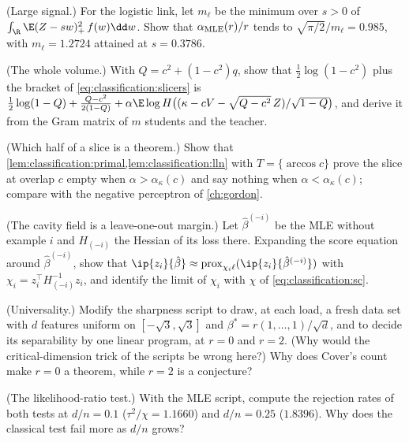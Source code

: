 \begin{refsection}
\begin{exercises}
\item \byhand\hard (Large signal.) For the logistic link, let $m_\ell$ be the minimum over $s>0$ of $\int_\R\E(Z-sw)_+^2\,f(w)\dd w$. Show that $\alpha_{\mathrm{MLE}}(r)/r$ tends to $\sqrt{\pi/2}/m_\ell=0.985$, with $m_\ell=1.2724$ attained at $s=0.3786$. \label{ex:classification:larger}

\item \byhand (The whole volume.) With $Q=c^2+(1-c^2)q$, show that $\frac12\log(1-c^2)$ plus the bracket of \eqref{eq:classification:slicers} is $\frac12\log(1-Q)+\frac{Q-c^2}{2(1-Q)}+\alpha\E\log H\bigl((\kappa-cV-\sqrt{Q-c^2}\,Z)/\sqrt{1-Q}\bigr)$, and derive it from the Gram matrix of $m$ students and the teacher.\label{ex:classification:entropy}

\item \translate (Which half of a slice is a theorem.) Show that \cref{lem:classification:primal,lem:classification:lln} with $T=\{\arccos c\}$ prove the slice at overlap $c$ empty when $\alpha>\alpha_\kappa(c)$ and say nothing when $\alpha<\alpha_\kappa(c)$; compare with the negative perceptron of \cref{ch:gordon}.\label{ex:classification:slice}

\item \translate\hard (The cavity field is a leave-one-out margin.) Let $\hat\beta^{(-i)}$ be the MLE without example $i$ and $H_{(-i)}$ the Hessian of its loss there. Expanding the score equation around $\hat\beta^{(-i)}$, show that $\ip{z_i}{\hat\beta}\approx\classificationprox_{\chi_i\ell}(\ip{z_i}{\hat\beta^{(-i)}})$ with $\chi_i=z_i^\top H_{(-i)}^{-1}z_i$, and identify the limit of $\chi_i$ with $\chi$ of \eqref{eq:classification:sc}.\label{ex:classification:cavity}

\item \measurement (Universality.) Modify the sharpness script to draw, at each load, a fresh data set with $d$ features uniform on $[-\sqrt3,\sqrt3]$ and $\beta^*=r(1,\dots,1)/\sqrt d$, and to decide its separability by one linear program, at $r=0$ and $r=2$. (Why would the critical-dimension trick of the scripts be wrong here?) Why does Cover's count make $r=0$ a theorem, while $r=2$ is a conjecture?\label{ex:classification:universality}

\item \measurement (The likelihood-ratio test.) With the MLE script, compute the rejection rates of both tests at $d/n=0.1$ ($\tau^2/\chi=1.1660$) and $d/n=0.25$ ($1.8396$). Why does the classical test fail more as $d/n$ grows?\label{ex:classification:lrt}


\end{exercises}
\end{refsection}
